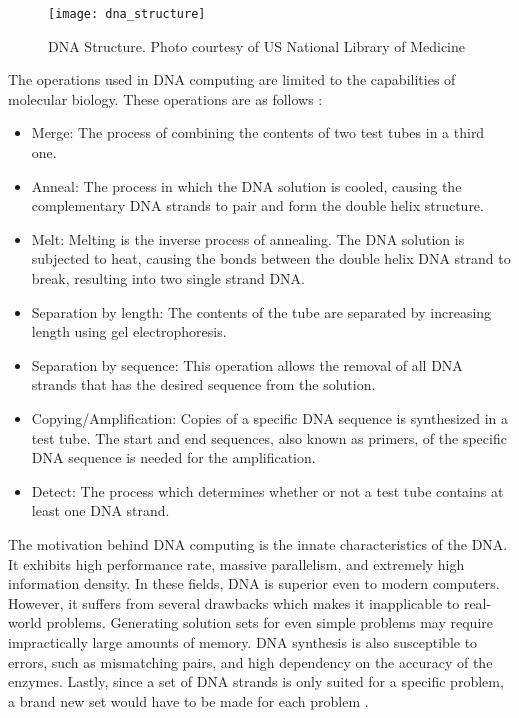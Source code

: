 \begin{figure}[H]
    \centering
    \texttt{[image: dna\_structure]}
    \caption{DNA Structure. Photo courtesy of US National Library of Medicine}
    \label{fig:dna}
\end{figure}

The operations used in DNA computing are limited to the capabilities of molecular biology. These operations are as follows \cite{processes}:
\begin{itemize}
    \item Merge: The process of combining the contents of two test tubes in a third one.
    \item Anneal: The process in which the DNA solution is cooled, causing the complementary DNA strands to pair and form the double helix structure. 
    \item Melt: Melting is the inverse process of annealing. The DNA solution is subjected to heat, causing the bonds between the double helix DNA strand to break, resulting into two single strand DNA.
    \item Separation by length: The contents of the tube are separated by increasing length using gel electrophoresis.
    \item Separation by sequence: This operation allows the removal of all DNA strands that has the desired sequence from the solution.
    \item Copying/Amplification: Copies of a specific DNA sequence is synthesized in a test tube. The start and end sequences, also known as primers, of the specific DNA sequence is needed for the amplification.
    \item Detect: The process which determines whether or not a test tube contains at least one DNA strand.
\end{itemize}

The motivation behind DNA computing is the innate characteristics of the DNA. It exhibits high performance rate, massive parallelism, and extremely high information density. In these fields, DNA is superior even to modern computers. However, it suffers from several drawbacks which makes it inapplicable to real-world problems. Generating solution sets for even simple problems may require impractically large amounts of memory. DNA synthesis is also susceptible to errors, such as mismatching pairs, and high dependency on the accuracy of the enzymes. Lastly, since a set of DNA strands is only suited for a specific problem, a brand new set would have to be made for each problem \cite{eval}.

